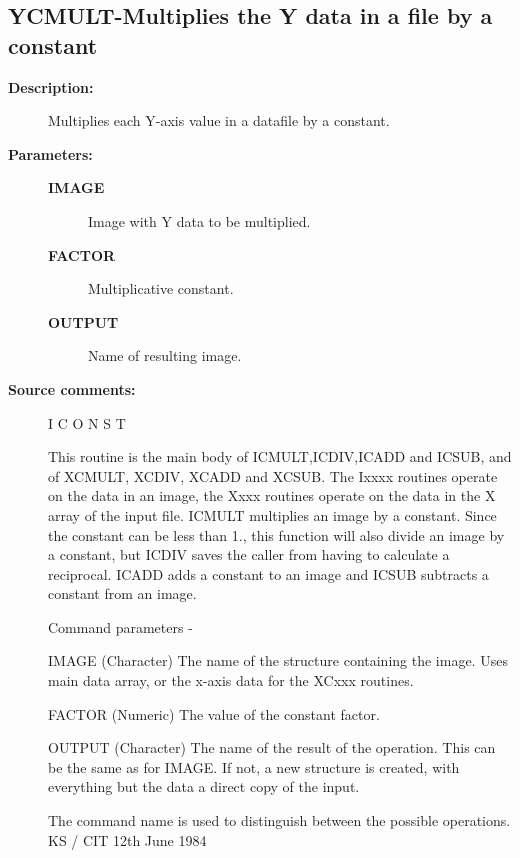 \subsection{YCMULT-\label{YCMULT}Multiplies the Y data in a file by a constant}
\begin{description}

\item [\textbf{Description:}]
 Multiplies each Y-axis value in a datafile by a constant.

\item [\textbf{Parameters:}]
\begin{description}
\item [\textbf{IMAGE}]
 Image with Y data to be multiplied.
\item [\textbf{FACTOR}]
 Multiplicative constant.
\item [\textbf{OUTPUT}]
 Name of resulting image.
\end{description}

\item [\textbf{Source comments:}]
\begin{terminalv}
 I C O N S T

 This routine is the main body of ICMULT,ICDIV,ICADD and ICSUB,
 and of XCMULT, XCDIV, XCADD and XCSUB.  The Ixxxx routines
 operate on the data in an image, the Xxxx routines operate on
 the data in the X array of the input file.
 ICMULT multiplies an image by a constant.  Since the constant
 can be less than 1., this function will also divide an
 image by a constant, but ICDIV saves the caller from having
 to calculate a reciprocal. ICADD adds a constant to an image and
 ICSUB subtracts a constant from an image.

 Command parameters -

 IMAGE  (Character) The name of the structure containing the image.
        Uses main data array, or the x-axis data for the XCxxx routines.

 FACTOR (Numeric) The value of the constant factor.

 OUTPUT (Character) The name of the result of the operation.  This
        can be the same as for IMAGE.  If not, a new structure
        is created, with everything but the data a direct
        copy of the input.

 The command name is used to distinguish between the
 possible operations.
                                  KS / CIT 12th June 1984
\end{terminalv}
\end{description}
